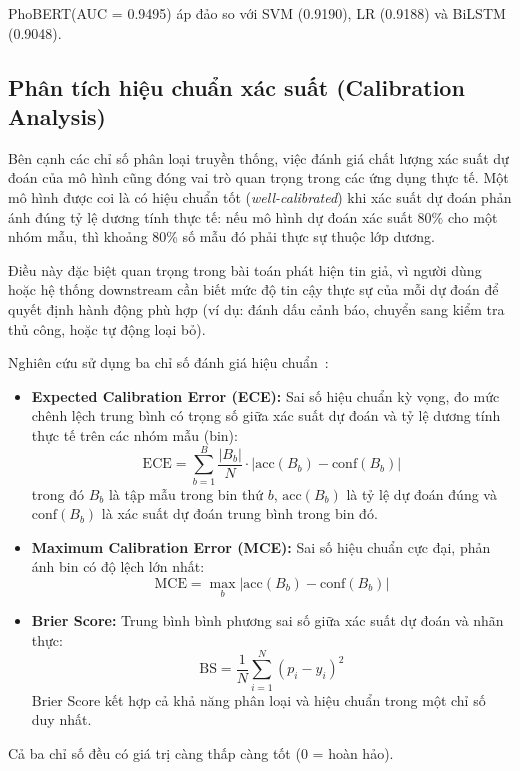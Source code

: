 \documentclass[12pt, a4paper]{report}
\newcommand{\phobert}{PhoBERT\xspace}
\newcommand{\phobertAUC}{0.9495}
\newcommand{\lrAUC}{0.9188}
\newcommand{\svmAUC}{0.9190}
\newcommand{\bilstmAUC}{0.9048}
\begin{document}
\phobert (AUC = \phobertAUC) áp đảo so với SVM (\svmAUC), LR (\lrAUC) và BiLSTM (\bilstmAUC).

\subsection{Phân tích hiệu chuẩn xác suất (Calibration Analysis)}
\label{sec:calibration}

Bên cạnh các chỉ số phân loại truyền thống, việc đánh giá chất lượng xác suất dự đoán của mô hình cũng đóng vai trò quan trọng trong các ứng dụng thực tế. Một mô hình được coi là có hiệu chuẩn tốt (\textit{well-calibrated}) khi xác suất dự đoán phản ánh đúng tỷ lệ dương tính thực tế: nếu mô hình dự đoán xác suất 80\% cho một nhóm mẫu, thì khoảng 80\% số mẫu đó phải thực sự thuộc lớp dương.

Điều này đặc biệt quan trọng trong bài toán phát hiện tin giả, vì người dùng hoặc hệ thống downstream cần biết mức độ tin cậy thực sự của mỗi dự đoán để quyết định hành động phù hợp (ví dụ: đánh dấu cảnh báo, chuyển sang kiểm tra thủ công, hoặc tự động loại bỏ).

Nghiên cứu sử dụng ba chỉ số đánh giá hiệu chuẩn~\cite{naeini2015ece}:

\begin{itemize}[leftmargin=2em]
  \item \textbf{Expected Calibration Error (ECE):} Sai số hiệu chuẩn kỳ vọng, đo mức chênh lệch trung bình có trọng số giữa xác suất dự đoán và tỷ lệ dương tính thực tế trên các nhóm mẫu (bin):
  \[
    \text{ECE} = \sum_{b=1}^{B} \frac{|B_b|}{N} \cdot |\text{acc}(B_b) - \text{conf}(B_b)|
  \]
  trong đó $B_b$ là tập mẫu trong bin thứ $b$, $\text{acc}(B_b)$ là tỷ lệ dự đoán đúng và $\text{conf}(B_b)$ là xác suất dự đoán trung bình trong bin đó.

  \item \textbf{Maximum Calibration Error (MCE):} Sai số hiệu chuẩn cực đại, phản ánh bin có độ lệch lớn nhất:
  \[
    \text{MCE} = \max_{b} |\text{acc}(B_b) - \text{conf}(B_b)|
  \]

  \item \textbf{Brier Score:} Trung bình bình phương sai số giữa xác suất dự đoán và nhãn thực:
  \[
    \text{BS} = \frac{1}{N} \sum_{i=1}^{N} (p_i - y_i)^2
  \]
  Brier Score kết hợp cả khả năng phân loại và hiệu chuẩn trong một chỉ số duy nhất.
\end{itemize}

Cả ba chỉ số đều có giá trị càng thấp càng tốt (0 = hoàn hảo).
\end{document}
